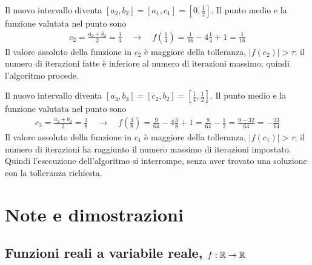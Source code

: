 \documentclass[letterpaper,10pt,italian]{jupyterBook}
\begin{document}
\sphinxAtStartPar
{} Il nuovo intervallo diventa \([a_2, b_2] = [a_1, c_1] = \left[0, \frac{1}{2}\right]\). Il punto medio e la funzione valutata nel punto sono
\begin{equation*}
\begin{split}c_2 = \frac{a_2 + b_2}{2} = \frac{1}{4} \quad \rightarrow \quad f\left(\frac{1}{4}\right) = \frac{1}{16} - 4 \frac{1}{4} + 1 = \frac{1}{16} \end{split}
\end{equation*}
\sphinxAtStartPar
Il valore assoluto della funzione in \(c_2\) è maggiore della tolleranza, \(|f(c_2)| > \tau\); il numero di iterazioni fatte è inferiore al numero di iterazioni massimo; quindi l’algoritmo procede.

\sphinxAtStartPar
{} Il nuovo intervallo diventa \([a_3, b_3] = [c_2, b_2] = \left[\frac{1}{4}, \frac{1}{2}\right]\). Il punto medio e la funzione valutata nel punto sono
\begin{equation*}
\begin{split}c_3 = \frac{a_2 + b_2}{2} = \frac{3}{8} \quad \rightarrow \quad f\left(\frac{3}{8}\right) = \frac{9}{64} - 4 \frac{3}{8} + 1 = \frac{9}{64} - \frac{1}{2} = \frac{9 - 32}{64} = - \frac{23}{64} \end{split}
\end{equation*}
\sphinxAtStartPar
Il valore assoluto della funzione in \(c_1\) è maggiore della tolleranza, \(|f(c_1)| > \tau\); il numero di iterazioni ha raggiunto il numero massimo di iterazioni impostato. Quindi l’esecuzione dell’algoritmo si interrompe, senza aver trovato una soluzione con la tolleranza richiesta.





\sphinxstepscope


\section{Note e dimostrazioni}
\label{\detokenize{ch/infinitesimal_calculus/analysis-notes:note-e-dimostrazioni}}\label{\detokenize{ch/infinitesimal_calculus/analysis-notes:infinitesimal-calculus-analysis-notes}}\label{\detokenize{ch/infinitesimal_calculus/analysis-notes::doc}}

\subsection{Funzioni reali a variabile reale, \protect\(f: \mathbb{R} \rightarrow \mathbb{R}\protect\)}
\label{\detokenize{ch/infinitesimal_calculus/analysis-notes:funzioni-reali-a-variabile-reale-f-mathbb-r-rightarrow-mathbb-r}}
\end{document}
